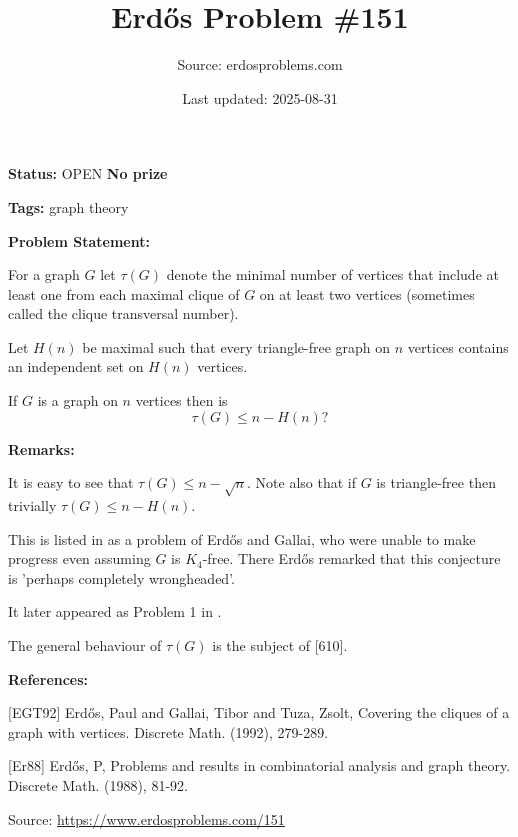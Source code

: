 \documentclass{article}
\title{Erd\H{o}s Problem \#151}
\date{Last updated: 2025-08-31}
\author{Source: erdosproblems.com}
\begin{document}
\maketitle

\noindent\textbf{Status:} OPEN \quad \textbf{No prize}

\noindent\textbf{Tags:} graph theory

\medskip
\noindent\textbf{Problem Statement:}

For a graph $G$ let $\tau(G)$ denote the minimal number of vertices that include at least one from each maximal clique of $G$ on at least two vertices (sometimes called the clique transversal number).

Let $H(n)$ be maximal such that every triangle-free graph on $n$ vertices contains an independent set on $H(n)$ vertices.

If $G$ is a graph on $n$ vertices then is\[\tau(G)\leq n-H(n)?\]

\bigskip
\noindent\textbf{Remarks:}

It is easy to see that $\tau(G) \leq n-\sqrt{n}$. Note also that if $G$ is triangle-free then trivially $\tau(G)\leq n-H(n)$.

This is listed in \cite{Er88} as a problem of Erd\H{o}s and Gallai, who were unable to make progress even assuming $G$ is $K_4$-free. There Erd\H{o}s remarked that this conjecture is 'perhaps completely wrongheaded'. 

It later appeared as Problem 1 in \cite{EGT92}.

The general behaviour of $\tau(G)$ is the subject of [610].

\bigskip
\noindent\textbf{References:}

[EGT92] Erd\H{o}s, Paul and Gallai, Tibor and Tuza, Zsolt, Covering the cliques of a graph with vertices. Discrete Math. (1992), 279-289.
 
 [Er88] Erd\H{o}s, P, Problems and results in combinatorial analysis and graph theory. Discrete Math. (1988), 81-92.

\bigskip
\noindent\small{Source: \url{https://www.erdosproblems.com/151}}
\end{document}
